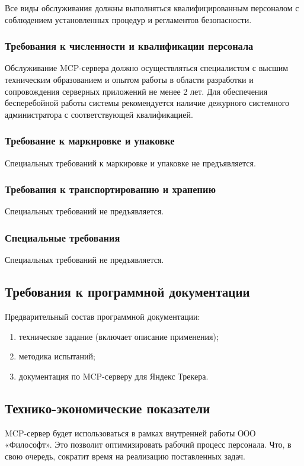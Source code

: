 \documentclass[utf8, russian]{eskdtext}
\begin{document}
Все виды обслуживания должны выполняться квалифицированным персоналом с соблюдением установленных процедур и регламентов безопасности.

\subsubsection{Требования к численности и квалификации персонала}

Обслуживание MCP-сервера должно осуществляться специалистом с высшим техническим образованием и опытом работы в области разработки и сопровождения серверных приложений не менее 2 лет. Для обеспечения бесперебойной работы системы рекомендуется наличие дежурного системного администратора с соответствующей квалификацией.

\subsubsection{Требование к маркировке и упаковке}
Специальных требований к маркировке и упаковке не предъявляется.

\subsubsection{Требования к транспортированию и хранению}
Специальных требований не предъявляется.

\subsubsection{Специальные требования}
Специальных требований не предъявляется.

\subsection{Требования к программной документации}
Предварительный состав программной документации:
\begin{enumerate}
    \item техническое задание (включает описание применения);
    \item методика испытаний;
    \item документация по MCP-серверу для Яндекс Трекера.
\end{enumerate}
    
\subsection{Технико-экономические показатели}
MCP-сервер будет использоваться в рамках внутренней работы ООО «Философт». Это позволит оптимизировать рабочий процесс персонала. Что, в свою очередь, сократит время на реализацию поставленных задач.
\end{document}
